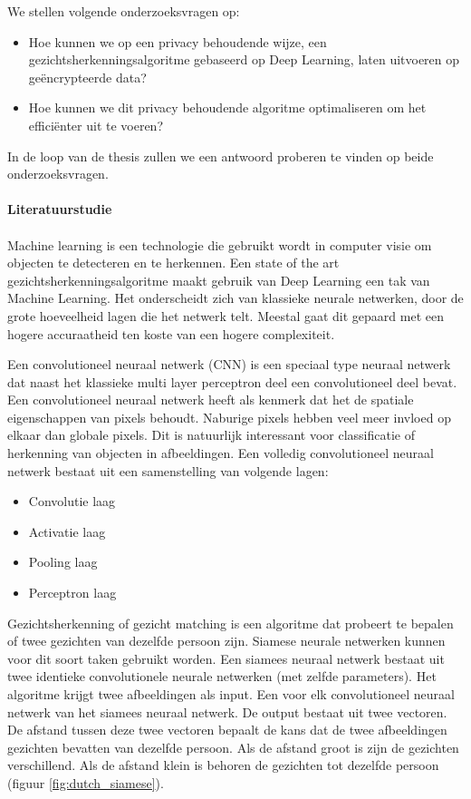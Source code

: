 We stellen volgende onderzoeksvragen op:

\begin{itemize}
  \item Hoe kunnen we op een privacy behoudende wijze, een gezichtsherkenningsalgoritme gebaseerd op Deep Learning, laten uitvoeren op ge\"encrypteerde data?
  \item Hoe kunnen we dit privacy behoudende algoritme optimaliseren om het effici\"enter uit te voeren?
\end{itemize}

In de loop van de thesis zullen we een antwoord proberen te vinden op beide onderzoeksvragen.\\\\

\textbf{\Large{Literatuurstudie}}\\\\
Machine learning is een technologie die gebruikt wordt in computer visie om objecten te detecteren en te herkennen. Een state of the art gezichtsherkenningsalgoritme maakt gebruik van Deep Learning een tak van Machine Learning. Het onderscheidt zich van klassieke neurale netwerken, door de grote hoeveelheid lagen die het netwerk telt. Meestal gaat dit gepaard met een hogere accuraatheid ten koste van een hogere complexiteit.

Een convolutioneel neuraal netwerk (CNN) is een speciaal type neuraal netwerk dat naast het klassieke multi layer perceptron deel een convolutioneel deel bevat. Een convolutioneel neuraal netwerk heeft als kenmerk dat het de spatiale eigenschappen van pixels behoudt. Naburige pixels hebben veel meer invloed op elkaar dan globale pixels. Dit is natuurlijk interessant voor classificatie of herkenning van objecten in afbeeldingen. Een volledig convolutioneel neuraal netwerk bestaat uit een samenstelling van volgende lagen:

\begin{itemize}
  \item Convolutie laag
  \item Activatie laag
  \item Pooling laag
  \item Perceptron laag
\end{itemize}

Gezichtsherkenning of gezicht matching is een algoritme dat probeert te bepalen of twee gezichten van dezelfde persoon zijn. Siamese neurale netwerken kunnen voor dit soort taken gebruikt worden. Een siamees neuraal netwerk bestaat uit twee identieke convolutionele neurale netwerken (met zelfde parameters). Het algoritme krijgt twee afbeeldingen als input. Een voor elk convolutioneel neuraal netwerk van het siamees neuraal netwerk. De output bestaat uit twee vectoren. De afstand tussen deze twee vectoren bepaalt de kans dat de twee afbeeldingen gezichten bevatten van dezelfde persoon. Als de afstand groot is zijn de gezichten verschillend. Als de afstand klein is behoren de gezichten tot dezelfde persoon (figuur \ref{fig:dutch_siamese}).

